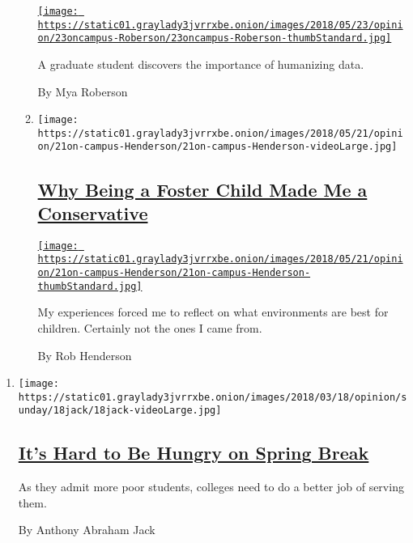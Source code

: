 \begin{enumerate}
\begin{enumerate}
    \href{/2018/05/23/opinion/graduate-student-cancer-research.html}{\texttt{[image: https://static01.graylady3jvrrxbe.onion/images/2018/05/23/opinion/23oncampus-Roberson/23oncampus-Roberson-thumbStandard.jpg]}}

    A graduate student discovers the importance of humanizing data.

    By Mya Roberson
  \item
    \texttt{[image: https://static01.graylady3jvrrxbe.onion/images/2018/05/21/opinion/21on-campus-Henderson/21on-campus-Henderson-videoLarge.jpg]}

    \hypertarget{why-being-a-foster-child-made-me-a-conservative}{%
    \subsection{\texorpdfstring{\href{/2018/05/21/opinion/foster-child-conservative.html}{Why
    Being a Foster Child Made Me a
    Conservative}}{Why Being a Foster Child Made Me a Conservative}}\label{why-being-a-foster-child-made-me-a-conservative}}

    \href{/2018/05/21/opinion/foster-child-conservative.html}{\texttt{[image: https://static01.graylady3jvrrxbe.onion/images/2018/05/21/opinion/21on-campus-Henderson/21on-campus-Henderson-thumbStandard.jpg]}}

    My experiences forced me to reflect on what environments are best
    for children. Certainly not the ones I came from.

    By Rob Henderson
  \end{enumerate}
\end{enumerate}

\begin{enumerate}
\def\labelenumi{\arabic{enumi}.}
\item
  \texttt{[image: https://static01.graylady3jvrrxbe.onion/images/2018/03/18/opinion/sunday/18jack/18jack-videoLarge.jpg]}

  \hypertarget{its-hard-to-be-hungry-on-spring-break}{%
  \subsection{\texorpdfstring{\href{/2018/03/17/opinion/sunday/spring-break-colleges-poor-students.html}{It's
  Hard to Be Hungry on Spring
  Break}}{It's Hard to Be Hungry on Spring Break}}\label{its-hard-to-be-hungry-on-spring-break}}

  As they admit more poor students, colleges need to do a better job of
  serving them.

  By Anthony Abraham Jack
\end{enumerate}

